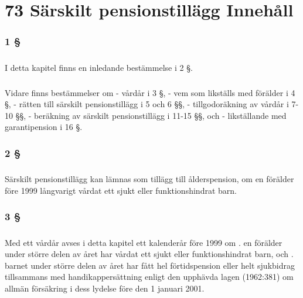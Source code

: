 \documentclass[a4paper,notitlepage,openany,10pt]{book}
\begin{document}
\chapter*{73 Särskilt pensionstillägg Innehåll}
\subsection*{1 §}
\paragraph*{}
I detta kapitel finns en inledande bestämmelse i 2 §.
\paragraph*{}
Vidare finns bestämmelser om
\newline - vårdår i 3 §,
\newline - vem som likställs med förälder i 4 §,
\newline - rätten till särskilt pensionstillägg i 5 och 6 §§,
\newline - tillgodoräkning av vårdår i 7-10 §§,
\newline - beräkning av särskilt pensionstillägg i 11-15 §§, och
\newline - likställande med garantipension i 16 §.
\subsection*{2 §}
\paragraph*{}
Särskilt pensionstillägg kan lämnas som tillägg till ålderspension, om en förälder före 1999 långvarigt vårdat ett sjukt eller funktionshindrat barn.
\subsection*{3 §}
\paragraph*{}
Med ett vårdår avses i detta kapitel ett kalenderår före 1999 om
. en förälder under större delen av året har vårdat ett sjukt eller funktionshindrat barn, och
. barnet under större delen av året har fått hel förtidspension eller helt sjukbidrag tillsammans med handikappersättning enligt den upphävda lagen (1962:381) om allmän försäkring i dess lydelse före den 1 januari 2001.
\end{document}

